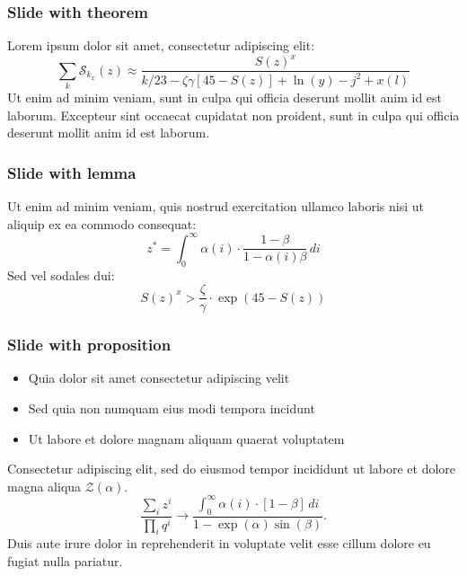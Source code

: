 \begin{frame}
\end{frame}


\begin{frame}
\frametitle{Slide with theorem}
\begin{theorem}
Lorem ipsum dolor sit amet, consectetur adipiscing elit:
\begin{equation*}
\sum_k\mathcal{S}_{k_x}(z) \approx \frac{S(z)^x}{k / 23 -\zeta\gamma [45- S(z)] + \ln(y) - j^2+x(l)}
\end{equation*}
Ut enim ad minim veniam, sunt in culpa qui officia deserunt mollit anim id est laborum. Excepteur sint occaecat cupidatat non proident, sunt in culpa qui officia deserunt mollit anim id est laborum.
\end{theorem}
\end{frame}


\begin{frame}
\frametitle{Slide with lemma}
\begin{lemma}
 Ut enim ad minim veniam, quis nostrud exercitation ullamco laboris nisi ut aliquip ex ea commodo consequat:
\begin{equation}
z^* = \int_{0}^{\infty} \alpha(i) \cdot \frac{1-\beta}{1-\alpha(i)\beta}\,di
\end{equation}
Sed vel sodales dui: 
\begin{equation}
S(z)^x > \frac{\zeta}{\gamma} \cdot \exp(45- S(z))
\end{equation}
\end{lemma}
\end{frame}

\begin{frame}
\frametitle{Slide with proposition}
\begin{itemize}
\item Quia dolor sit amet consectetur adipiscing velit
\item Sed quia non numquam eius modi tempora incidunt
\item Ut labore et dolore magnam aliquam quaerat voluptatem
\end{itemize}
\begin{proposition}
Consectetur adipiscing elit, sed do eiusmod tempor incididunt ut labore et dolore magna aliqua $\mathcal{Z}(\alpha)$. 
\begin{equation*}
\frac{\sum_i z^i}{\prod_i q^i} \to \frac{\int_{0}^{\infty} \alpha(i) \cdot [1-\beta]\,di}{1-\exp(\alpha)\sin(\beta)}.
\end{equation*}
Duis aute irure dolor in reprehenderit in voluptate velit esse cillum dolore eu fugiat nulla pariatur. 
\end{proposition}
\end{frame}

